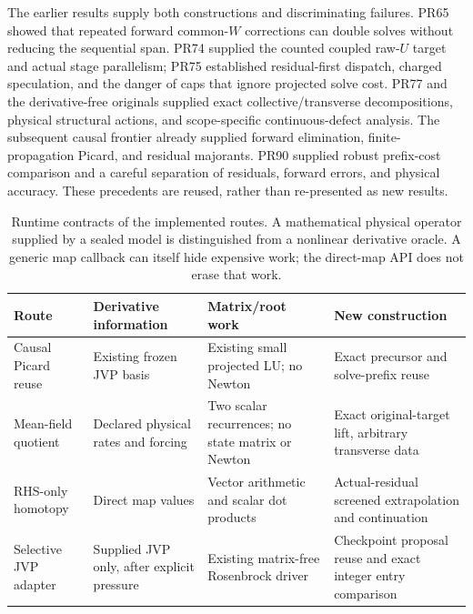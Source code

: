 \documentclass[aps,pra,reprint,onecolumn,12pt,notitlepage,superscriptaddress,nofootinbib]{revtex4-2}
\begin{document}
The earlier results supply both constructions and discriminating failures.
PR65 showed that repeated forward common-$W$ corrections can double solves
without reducing the sequential span. PR74 supplied the counted coupled
raw-$U$ target and actual stage parallelism; PR75 established residual-first
dispatch, charged speculation, and the danger of caps that ignore projected
solve cost. PR77 and the derivative-free originals supplied exact
collective/transverse decompositions, physical structural actions, and
scope-specific continuous-defect analysis. The subsequent causal frontier
already supplied forward elimination, finite-propagation Picard, and
residual majorants. PR90 supplied robust prefix-cost comparison and a careful
separation of residuals, forward errors, and physical accuracy. These
precedents are reused, rather than re-presented as new results.

\begin{table}[t]\centering
\caption{Runtime contracts of the implemented routes. A mathematical physical
operator supplied by a sealed model is distinguished from a nonlinear
derivative oracle. A generic map callback can itself hide expensive work;
the direct-map API does not erase that work.}
\begin{tabular}{p{}p{}p{}p{}}\toprule
Route & Derivative information & Matrix/root work & New construction\\\midrule
Causal Picard reuse & Existing frozen JVP basis & Existing small projected LU; no Newton & Exact precursor and solve-prefix reuse\\
Mean-field quotient & Declared physical rates and forcing & Two scalar recurrences; no state matrix or Newton & Exact original-target lift, arbitrary transverse data\\
RHS-only homotopy & Direct map values & Vector arithmetic and scalar dot products & Actual-residual screened extrapolation and continuation\\
Selective JVP adapter & Supplied JVP only, after explicit pressure & Existing matrix-free Rosenbrock driver & Checkpoint proposal reuse and exact integer entry comparison\\
\bottomrule\end{tabular}
\end{table}


\end{document}
